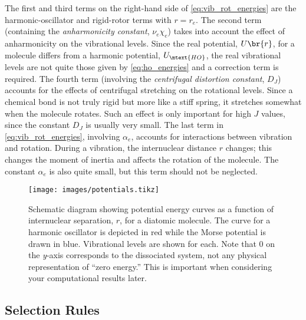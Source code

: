 The first and third terms on the right-hand side of \cref{eq:vib_rot_energies} are the harmonic-oscillator and rigid-rotor terms with \( r = r_e \).
The second term (containing the \emph{anharmonicity constant}, \( \nu_e\chi_e \)) takes into account the effect of anharmonicity on the vibrational levels. 
Since the real potential, \( U\br{r} \), for a molecule differs from a harmonic potential, \( U_\mtext{HO} \), the real vibrational levels are not quite those given by \cref{eq:ho_energies} and a correction term is required. 
The fourth term (involving the \emph{centrifugal distortion constant}, \( D_J \)) accounts for the effects of centrifugal stretching on the rotational levels. 
Since a chemical bond is not truly rigid but more like a stiff spring, it stretches somewhat when the molecule rotates. 
Such an effect is only important for high \( J \) values, since the constant \( D_J \) is usually very small. 
The last term in \cref{eq:vib_rot_energies}, involving \( \alpha_e \), accounts for interactions between vibration and rotation. 
During a vibration, the internuclear distance \( r \) changes; this changes the moment of inertia and affects the rotation of the molecule. 
The constant \( \alpha_e \) is also quite small, but this term should not be neglected. 

\begin{figure}[tb]
  \centering
    \texttt{[image: images/potentials.tikz]}
  \caption{Schematic diagram showing potential energy curves as a function of internuclear separation, \( r \), for a diatomic molecule.
		The curve for a harmonic oscillator is depicted in red while the Morse potential is drawn in blue.
		Vibrational levels are shown for each.
    Note that \( 0 \) on the \emph{y}-axis corresponds to the dissociated system, not any physical representation of ``zero energy.''
    This is important when considering your computational results later. 
	}
  \label{fig:potential_curves}
\end{figure}

\subsection{Selection Rules} %
\label{sub:selection_rules}

